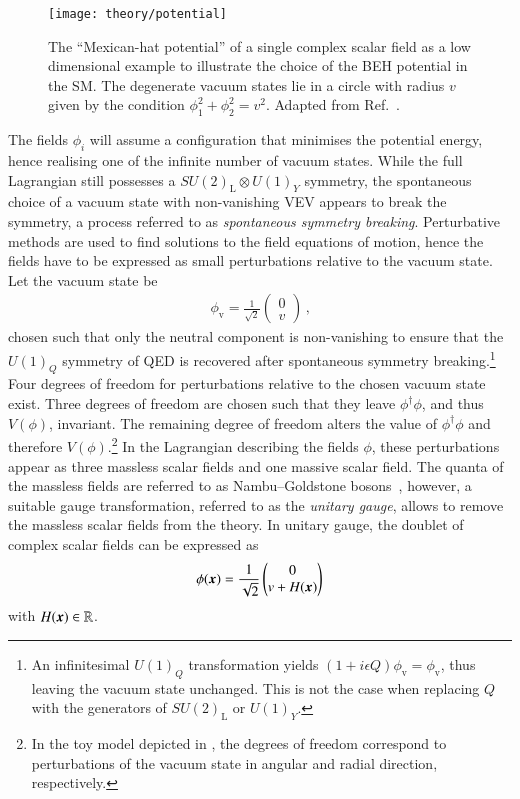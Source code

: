 \begin{figure}[htbp]
  \centering

  \texttt{[image: theory/potential]}

  \caption{The ``Mexican-hat potential'' of a single complex scalar field as a
    low dimensional example to illustrate the choice of the BEH potential in the
    SM. The degenerate vacuum states lie in a circle with radius $v$ given by
    the condition $\phi_1^2 + \phi_2^2 = v^2$. Adapted from
    Ref.~\cite{higgs_potential_tikz}.}%
  \label{fig:mexican_hat}
\end{figure}

The fields $\phi_i$ will assume a configuration that minimises the potential
energy, hence realising one of the infinite number of vacuum states. While the
full Lagrangian still possesses a $SU(2)_{\text{L}} \otimes U(1)_Y$ symmetry,
the spontaneous choice of a vacuum state with non-vanishing VEV appears to break
the symmetry, a process referred to as \emph{spontaneous symmetry
  breaking}. Perturbative methods are used to find solutions to the field
equations of motion, hence the fields have to be expressed as small
perturbations relative to the vacuum state. Let the vacuum state be
\begin{align*}
  \phi_{\text{v}} = \frac{1}{\sqrt{2}}
  \begin{pmatrix}
    0 \\
    v
  \end{pmatrix} \,\text{,}
\end{align*}
chosen such that only the neutral component is non-vanishing to ensure that the
$U(1)_Q$ symmetry of QED is recovered after spontaneous symmetry
breaking.\footnote{An infinitesimal $U(1)_Q$ transformation yields
  $(1 + i \epsilon Q) \phi_{\text{v}} = \phi_{\text{v}}$, thus leaving the
  vacuum state unchanged. This is not the case when replacing $Q$ with the
  generators of $SU(2)_{\text{L}}$ or $U(1)_Y$.} Four degrees of freedom for
perturbations relative to the chosen vacuum state exist. Three degrees of
freedom are chosen such that they leave $\phi^\dagger \phi$, and thus $V(\phi)$,
invariant. The remaining degree of freedom alters the value of
$\phi^\dagger \phi$ and therefore $V(\phi)$.\footnote{In the toy model depicted
  in , the degrees of freedom correspond to perturbations
  of the vacuum state in angular and radial direction, respectively.} In the
Lagrangian describing the fields $\phi$, these perturbations appear as three
massless scalar fields and one massive scalar field. The quanta of the massless
fields are referred to as Nambu--Goldstone
bosons~\cite{Nambu:1960tm,Goldstone:1961eq}, however, a suitable gauge
transformation, referred to as the \emph{unitary gauge}, allows to remove the
massless scalar fields from the theory. In unitary gauge, the doublet of complex
scalar fields can be expressed as
\begin{align}
  \phi(\myvec{x}) = \frac{1}{\sqrt{2}}
  \begin{pmatrix}
    0 \\
    v + H(\myvec{x})
  \end{pmatrix}
  \label{eq:vacuum_state_perturb}
\end{align}
with $H(\myvec{x}) \in \mathbb{R}$.

